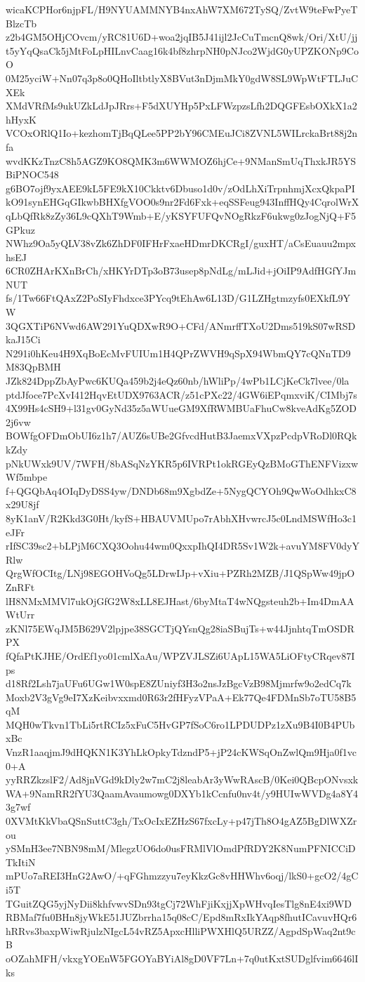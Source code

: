 wicaKCPHor6njpFL/H9NYUAMMNYB4nxAhW7XM672TySQ/ZvtW9teFwPyeTBlzcTb
z2b4GM5OHjCOvcm/yRC81U6D+woa2jqIB5J41ijl2JcCuTmcnQ8wk/Ori/XtU/jj
t5yYqQsaCk5jMtFoLpHILnvCaag16k4bf8zhrpNH0pNJco2WjdG0yUPZKONp9CoO
0M25yciW+Nn07q3p8o0QHoIltbtlyX8BVut3nDjmMkY0gdW8SL9WpWtFTLJuCXEk
XMdVRfMs9ukUZkLdJpJRrs+F5dXUYHp5PxLFWzpzsLfh2DQGFEsbOXkX1a2hHyxK
VCOxORlQ1Io+kezhomTjBqQLee5PP2bY96CMEuJCi8ZVNL5WILrckaBrt88j2nfa
wvdKKzTnzC8h5AGZ9KO8QMK3m6WWMOZ6hjCe+9NManSmUqThxkJR5YSBiPNOC548
g6BO7ojf9yxAEE9kL5FE9kX10Ckktv6Dbuso1d0v/zOdLhXiTrpnhmjXcxQkpaPI
kO91synEHGqGIkwbBHXfgVOO0s9nr2Fd6Fxk+eqSSFeug943InffHQy4CqrolWrX
qLbQfRk8zZy36L9cQXhT9Wmb+E/yKSYFUFQvNOgRkzF6ukwg0zJogNjQ+F5GPkuz
NWhz9Oa5yQLV38vZk6ZhDF0IFHrFxaeHDmrDKCRgI/guxHT/aCsEuauu2mpxhsEJ
6CR0ZHArKXnBrCh/xHKYrDTp3oB73usep8pNdLg/mLJid+jOiIP9AdfHGfYJmNUT
fs/1Tw66FtQAxZ2PoSIyFhdxce3PYcq9tEhAw6L13D/G1LZHgtmzyfs0EXkfL9YW
3QGXTiP6NVwd6AW291YuQDXwR9O+CFd/ANmrffTXoU2Dms519kS07wRSDkaJ15Ci
N291i0hKeu4H9XqBoEcMvFUIUm1H4QPrZWVH9qSpX94WbmQY7cQNnTD9M83QpBMH
JZk824DppZbAyPwc6KUQa459b2j4eQz60nb/hWliPp/4wPb1LCjKeCk7lvee/0la
ptdJfoce7PcXvI412HqvEtUDX9763ACR/z51cPXc22/4GW6iEPqmxviK/CIMbj7s
4X99Hs4cSH9+l31gv0GyNd35z5aWUueGM9XfRWMBUaFhuCw8kveAdKg5ZOD2j6vw
BOWfgOFDmObUI6z1h7/AUZ6sUBe2GfvcdHutB3JaemxVXpzPcdpVRoDl0RQkkZdy
pNkUWxk9UV/7WFH/8bASqNzYKR5p6IVRPt1okRGEyQzBMoGThENFVizxwWf5mbpe
f+QGQbAq4OIqDyDSS4yw/DNDb68m9XgbdZe+5NygQCYOh9QwWoOdhkxC8x29U8jf
8yK1anV/R2Kkd3G0Ht/kyfS+HBAUVMUpo7rAbhXHvwrcJ5c0LndMSWfHo3c1eJFr
rIfSC39sc2+bLPjM6CXQ3Oohu44wm0QxxpIhQI4DR5Sv1W2k+avuYM8FV0dyYRlw
QrgWfOCItg/LNj98EGOHVoQg5LDrwIJp+vXiu+PZRh2MZB/J1QSpWw49jpOZnRFt
lH8NMxMMVl7ukOjGfG2W8xLL8EJHast/6byMtaT4wNQgsteuh2b+Im4DmAAWtUrr
zKNl75EWqJM5B629V2lpjpe38SGCTjQYsnQg28iaSBujTs+w44JjnhtqTmOSDRPX
fQfaPtKJHE/OrdEf1yo01cmlXaAu/WPZVJLSZi6UApL15WA5LiOFtyCRqev87Ips
d18Rf2Lsh7jaUFu6UGw1W0spE8ZUniyf3H3o2nsJzBgcVzB98Mjmrfw9o2edCq7k
Moxb2V3gVg9eI7XzKeibvxxmd0R63r2fHFyzVPaA+Ek77Qe4FDMnSb7oTU58B5qM
MQH0wTkvn1TbLi5rtRCIz5xFuC5HvGP7fSoC6ro1LPDUDPz1zXu9B4I0B4PUbxBc
VnzR1aaqjmJ9dHQKN1K3YhLkOpkyTdzndP5+jP24cKWSqOnZwlQm9Hja0f1vc0+A
yyRRZkzslF2/Ad8jnVGd9kDly2w7mC2j8leabAr3yWwRAscB/0Kei0QBcpONvsxk
WA+9NamRR2fYU3QaamAvaumowg0DXYb1kCcnfu0nv4t/y9HUIwWVDg4a8Y43g7wf
0XVMtKkVbaQSnSuttC3gh/TxOcIxEZHzS67fxcLy+p47jTh8O4gAZ5BgDlWXZrou
ySMnH3ee7NBN98mM/MlegzUO6do0usFRMlVlOmdPfRDY2K8NumPFNICCiDTkItiN
mPUo7aREI3HnG2AwO/+qFGhmzzyu7eyKkzGc8vHHWhv6oqj/lkS0+gcO2/4gCi5T
TGuitZQG5yjNyDii8khfvwvSDn93tgCj72WhFjiKxjjXpWHvqIesTlg8nE4xi9WD
RBMaf7fu0BHn8jyWkE51JUZbrrha15q08cC/Epd8mRxIkYAqp8fhutICavuvHQr6
hRRvs3baxpWiwRjulzNIgcL54vRZ5ApxcHlliPWXHlQ5URZZ/AgpdSpWaq2nt9cB
oOZahMFH/vkxgYOEnW5FGOYaBYiAl8gD0VF7Ln+7q0utKxtSUDglfvim6646lIks
